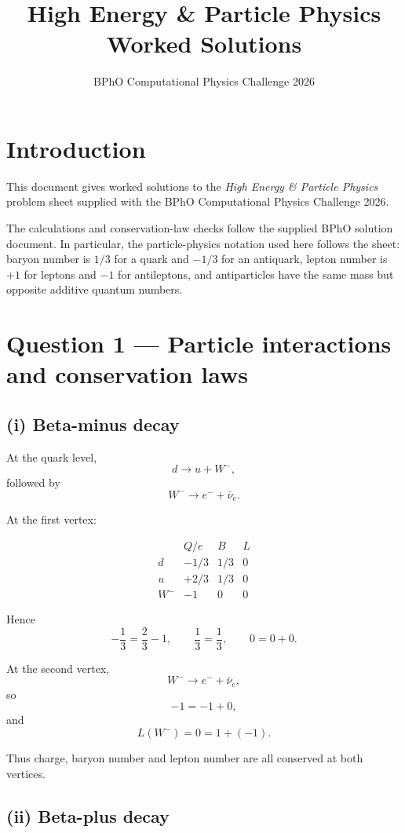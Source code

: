 \documentclass[11pt,a4paper]{article}
\title{\textbf{High Energy \& Particle Physics}\\Worked Solutions}
\author{BPhO Computational Physics Challenge 2026}
\date{}
\begin{document}
\maketitle

\section*{Introduction}

This document gives worked solutions to the \emph{High Energy \& Particle Physics}
problem sheet supplied with the BPhO Computational Physics Challenge 2026.

The calculations and conservation-law checks follow the supplied BPhO solution
document. In particular, the particle-physics notation used here follows the sheet:
baryon number is $1/3$ for a quark and $-1/3$ for an antiquark, lepton number is
$+1$ for leptons and $-1$ for antileptons, and antiparticles have the same mass but
opposite additive quantum numbers.

\section{Question 1 --- Particle interactions and conservation laws}

\subsection{(i) Beta-minus decay}

At the quark level,
\[
d\rightarrow u+W^-,
\]
followed by
\[
W^-\rightarrow e^-+\bar{\nu}_e.
\]

At the first vertex:

\[
\begin{array}{c|ccc}
 & Q/e & B & L\\
\hline
d & -1/3 & 1/3 & 0\\
u & +2/3 & 1/3 & 0\\
W^- & -1 & 0 & 0
\end{array}
\]

Hence
\[
-\frac13=\frac23-1,
\qquad
\frac13=\frac13,
\qquad
0=0+0.
\]

At the second vertex,
\[
W^-\rightarrow e^-+\bar{\nu}_e,
\]
so
\[
-1=-1+0,
\]
and
\[
L(W^-)=0=1+(-1).
\]

Thus charge, baryon number and lepton number are all conserved at both vertices.

\subsection{(ii) Beta-plus decay}
\end{document}
